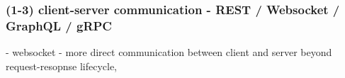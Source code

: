 
\subsubsection*{(1-3) client-server communication - REST / Websocket / GraphQL / gRPC}

- websocket - more direct communication between client and server beyond request-resopnse lifecycle, 




